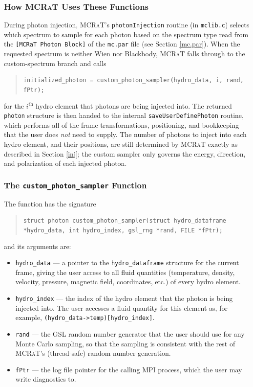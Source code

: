 \documentclass[12pt,a4paper]{article}
\newcommand{\mcrat}{\textsc{MCRaT}}
\begin{document}
\subsubsection{How \mcrat{} Uses These Functions}
During photon injection, \mcrat{}'s \texttt{photonInjection} routine (in \texttt{mclib.c}) selects which spectrum to sample for each photon based on the spectrum type read from the \texttt{[MCRaT Photon Block]} of the \texttt{mc.par} file (see Section \ref{mc.par}). When the requested spectrum is neither Wien nor Blackbody, \mcrat{} falls through to the custom-spectrum branch and calls
\begin{quotation}
	\texttt{initialized\_photon = custom\_photon\_sampler(hydro\_data, i, rand, fPtr);}
\end{quotation}
for the $i^\mathrm{th}$ hydro element that photons are being injected into. The returned \texttt{photon} structure is then handed to the internal \texttt{saveUserDefinePhoton} routine, which performs all of the frame transformations, positioning, and bookkeeping that the user does \emph{not} need to supply. The number of photons to inject into each hydro element, and their positions, are still determined by \mcrat{} exactly as described in Section \ref{inj}; the custom sampler only governs the energy, direction, and polarization of each injected photon.

\subsubsection{The \texttt{custom\_photon\_sampler} Function}
The function has the signature
\begin{quotation}
	\texttt{struct photon custom\_photon\_sampler(struct hydro\_dataframe *hydro\_data, int hydro\_index, gsl\_rng *rand, FILE *fPtr);}
\end{quotation}
and its arguments are:
\begin{itemize}
	\item \texttt{hydro\_data} --- a pointer to the \texttt{hydro\_dataframe} structure for the current frame, giving the user access to all fluid quantities (temperature, density, velocity, pressure, magnetic field, coordinates, etc.) of every hydro element.
	\item \texttt{hydro\_index} --- the index of the hydro element that the photon is being injected into. The user accesses a fluid quantity for this element as, for example, \texttt{(hydro\_data->temp)[hydro\_index]}.
	\item \texttt{rand} --- the GSL random number generator that the user should use for any Monte Carlo sampling, so that the sampling is consistent with the rest of \mcrat{}'s (thread-safe) random number generation.
	\item \texttt{fPtr} --- the log file pointer for the calling MPI process, which the user may write diagnostics to.
\end{itemize}
\end{document}
